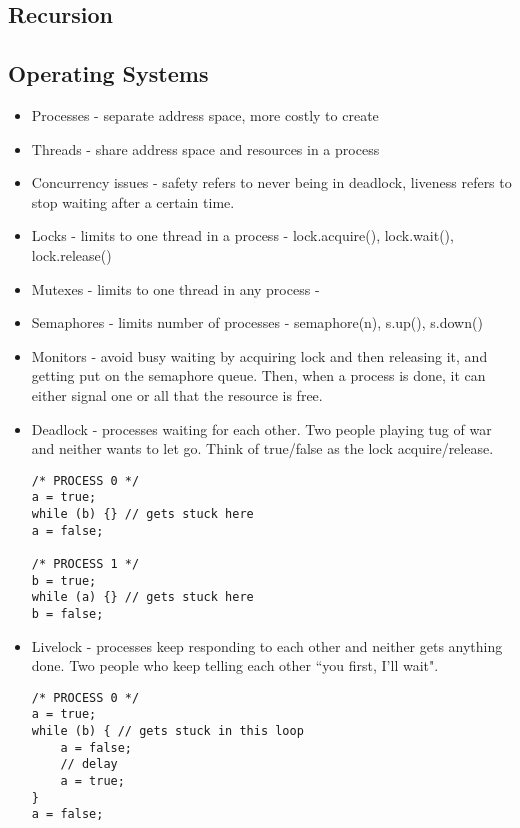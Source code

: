 \documentclass{article}
\begin{document}
\subsection{Recursion}

\subsection{Operating Systems}
\begin{itemize}
    \item Processes - separate address space, more costly to create
    \item Threads - share address space and resources in a process
    \item Concurrency issues - safety refers to never being in deadlock, liveness refers to stop waiting after a certain time.
    \item Locks - limits to one thread in a process - lock.acquire(), lock.wait(), lock.release()
    \item Mutexes - limits to one thread in any process - 
    \item Semaphores - limits number of processes - semaphore(n), s.up(), s.down()
    \item Monitors - avoid busy waiting by acquiring lock and then releasing it, and getting put on the semaphore queue. Then, when a process is done, it can either signal one or all that the resource is free.
    \item Deadlock - processes waiting for each other. Two people playing tug of war and neither wants to let go. Think of true/false as the lock acquire/release.
    \begin{lstlisting}
/* PROCESS 0 */
a = true; 
while (b) {} // gets stuck here
a = false; 

/* PROCESS 1 */
b = true;
while (a) {} // gets stuck here
b = false;
    \end{lstlisting}
    \item Livelock - processes keep responding to each other and neither gets anything done. Two people who keep telling each other ``you first, I'll wait".
\begin{lstlisting}
/* PROCESS 0 */
a = true; 
while (b) { // gets stuck in this loop
    a = false;
    // delay
    a = true;
}
a = false; 


\end{lstlisting}
\end{itemize}
\end{document}
